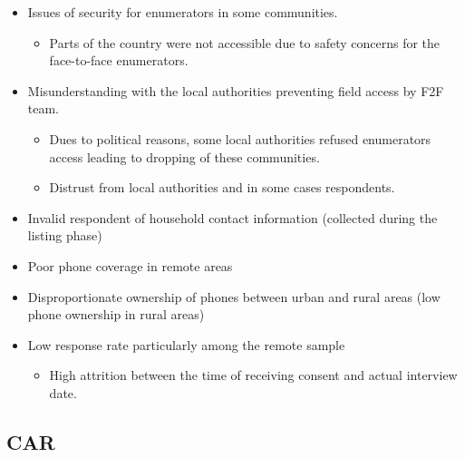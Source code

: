 \documentclass[11pt,harvard]{article}
\begin{document}
	\begin{itemize}[label=--, left=1.5em]
		\item[1.] Issues of security for enumerators in some communities.
			\begin{itemize}[left=1.5em]
				\item[a.]	Parts of the country were not accessible due to safety concerns for the face-to-face enumerators.
			\end{itemize}
			\item[2.] Misunderstanding with the local authorities preventing field access by F2F team.
			\begin{itemize}[left=1.5em]
					\item[a.]	Dues to political reasons, some local authorities refused enumerators access leading to dropping of these communities.
					\item[b.]	Distrust from local authorities and in some cases respondents.
			\end{itemize}
		\item[3.] Invalid respondent of household contact information (collected during the listing phase)
		\item[4.] Poor phone coverage in remote areas
		\item[5.] Disproportionate ownership of phones between urban and rural areas (low phone ownership in rural areas)
		\item[6.] Low response rate particularly among the remote sample
			\begin{itemize}[left=1.5em]
				\item[a.]	High attrition between the time of receiving consent and actual interview date.
			\end{itemize}
	\end{itemize}	
	
\subsection{CAR}
	
\end{document}
